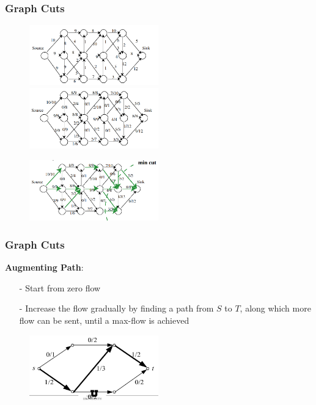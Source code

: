 \documentclass[notheorems,mathserif,table,compress]{beamer}  %
\begin{document}
\begin{frame}
\frametitle{Graph Cuts}
    \begin{figure}[!ht]
    \begin{minipage}[t]{0.45\linewidth}
    \centering
    \includegraphics[width=2.2in]{Maxflow1.png}
    \end{minipage}
    \begin{minipage}[t]{0.45\linewidth}
    \centering
    \includegraphics[width=2.2in]{Maxflow2.png}
    \end{minipage}
    \end{figure}
    \begin{figure}[!ht]
    \begin{minipage}[t]{0.45\linewidth}
    \centering
    \includegraphics[width=2.2in]{Maxflow3.png}
    \end{minipage}
    \end{figure}
\end{frame}

\begin{frame}
\frametitle{Graph Cuts}
\textbf{Augmenting Path}:
\begin{itemize}
\item[-] Start from zero flow
\item[-] Increase the flow gradually by finding a path from $S$ to $T$, along which more flow can be sent, until a max-flow is achieved
\end{itemize}
  \begin{figure}[!ht]
  \centering
   \includegraphics[width=2.2in]{augment.png}
   \end{figure}
\end{frame}
\end{document}
